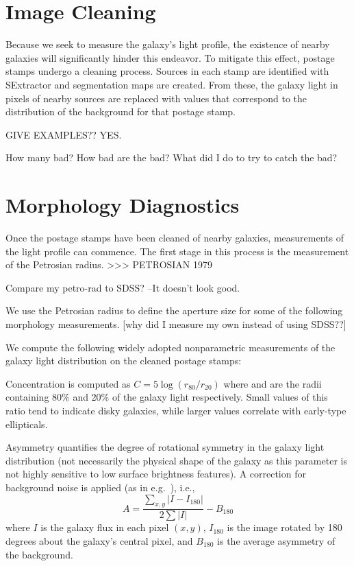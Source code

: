 \section{Image Cleaning}
Because we seek to measure the galaxy's light profile, the existence of nearby galaxies will significantly hinder this endeavor. To mitigate this effect, postage stamps undergo a cleaning process. Sources in each stamp are identified with SExtractor \citep[ver. 2.8.6;][]{sextractor} and segmentation maps are created. From these, the galaxy light in pixels of nearby sources are replaced with values that correspond to the distribution of the background for that postage stamp. 

 GIVE EXAMPLES??  YES. 

 How many bad? How bad are the bad? What did I do to try to catch the bad? 

\section{Morphology Diagnostics}
Once the postage stamps have been cleaned of nearby galaxies, measurements of the light profile can commence. The first stage in this process is the measurement of the Petrosian radius. 
>>> PETROSIAN 1979

Compare my petro-rad to SDSS? --It doesn't look good. 

We use the Petrosian radius to define the aperture size for some of the following morphology measurements. [why did I measure my own instead of using SDSS??]

We compute the following widely adopted nonparametric measurements of the galaxy light distribution on the cleaned postage stamps:

Concentration is computed as $C = 5\log(r_{80}/ r_{20})$ where  and  are the
radii containing 80\% and 20\% of the galaxy light respectively.  Small values of this ratio 
tend to indicate disky galaxies, while larger values correlate with early-type ellipticals. 

Asymmetry quantifies the degree of rotational symmetry in the galaxy light distribution
 (not necessarily the physical shape of the galaxy as this parameter is not highly sensitive 
to low surface brightness features). A correction for background noise is applied (as in e.g.~\cite{Conselice2000}), i.e., 
\begin{equation}
A = \frac{\sum_{x,y} |I - I_{180}|}{ 2\sum|I|} - B_{180}
\end{equation}
where $I$ is the galaxy flux in each pixel $(x, y)$, $I_{180}$ is the image rotated by 180 degrees about the galaxy's central pixel, and $B_{180}$ is the average asymmetry of the background. 

